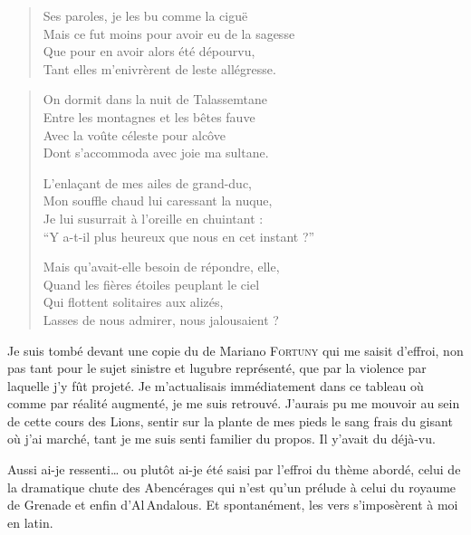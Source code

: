\begin{verse}%
  \quatrain%
  Ses paroles, je les bu comme la ciguë\\  %
  Mais ce fut moins pour avoir eu de la sagesse\\  %
  Que pour en avoir alors été dépourvu,\\  %
  Tant elles m’enivrèrent de leste allégresse.
\end{verse}


\begin{verse}%
  \quatrain%
  On dormit dans la nuit de Talassemtane\\  %
  Entre les montagnes et les bêtes fauve\\  %
  Avec la voûte céleste pour alcôve\\  %
  Dont s’accommoda avec joie ma sultane.

  L’enlaçant de mes ailes de grand-duc,\\  %
  Mon souffle chaud lui caressant la nuque,\\  %
  Je lui susurrait à l’oreille en chuintant :\\  %
  \enquote{Y a-t-il plus heureux que nous en cet instant ?}

  Mais qu’avait-elle besoin de répondre, elle,\\  %
  Quand les fières étoiles peuplant le ciel\\  %
  Qui flottent solitaires aux alizés,\\  %
  Lasses de nous admirer, nous jalousaient ?
\end{verse}


\begin{prose}
  Je suis tombé devant une copie du  de Mariano \textsc{Fortuny} qui me saisit d’effroi, non pas tant pour le sujet sinistre et lugubre représenté, que par la violence par laquelle j’y fût projeté. Je m’actualisais immédiatement dans ce tableau où comme par réalité augmenté, je me suis retrouvé. J’aurais pu me mouvoir au sein de cette cours des Lions, sentir sur la plante de mes pieds le sang frais du gisant où j’ai marché, tant je me suis senti familier du propos. Il y’avait du déjà-vu.

  Aussi ai-je ressenti… ou plutôt ai-je été saisi par l’effroi du thème abordé, celui de la dramatique chute des Abencérages qui n’est qu’un prélude à celui du royaume de Grenade et enfin d’Al\,Andalous. Et spontanément, les vers s’imposèrent à moi en latin.
\end{prose}

